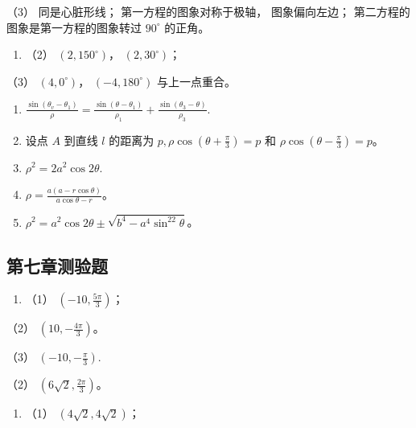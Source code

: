 （3） 同是心脏形线； 第一方程的图象对称于极轴， 图象偏向左边；
第二方程的图象是第一方程的图象转过 \(90^{\circ}\) 的正角。

\begin{enumerate}
\def\labelenumi{\arabic{enumi}.}
\setcounter{enumi}{2}
\tightlist
\item
  （2） \((2, 150^{\circ})\)， \((2, 30^{\circ})\)；
\end{enumerate}

（3） \((4, 0^{\circ})\)， \((-4, 180^{\circ})\) 与上一点重合。

\begin{enumerate}
\def\labelenumi{\arabic{enumi}.}
\setcounter{enumi}{3}
\item
  \(\frac{\sin(\theta_{v} - \theta_{1})}{\rho} = \frac{\sin(\theta - \theta_{1})}{\rho_{1}} + \frac{\sin(\theta_{3} - \theta)}{\rho_{3}}.\)
\item
  设点 \(A\) 到直线 \(l\) 的距离为
  \(p, \rho \cos \left( \theta + \frac{\pi}{3} \right) = p\) 和
  \(\rho \cos \left( \theta - \frac{\pi}{3} \right) = p\)。
\item
  \(\rho^2 = 2a^2\cos 2\theta .\)
\item
  \(\rho = \frac{a(a - r\cos\theta)}{a\cos\theta - r}\)。
\item
  \(\rho^2 = a^2\cos 2\theta \pm \sqrt{b^4 - a^4\sin^22\theta}\)。
\end{enumerate}

\subsection{第七章测验题}\label{ux7b2cux4e03ux7ae0ux6d4bux9a8cux9898-1}

\begin{enumerate}
\def\labelenumi{\arabic{enumi}.}
\tightlist
\item
  （1） \(\left(-10, \frac{5\pi}{3}\right)\)；
\end{enumerate}

（2） \(\left(10, -\frac{4\pi}{3}\right)\)。

（3） \(\left(-10,-\frac{\pi}{3}\right).\)

（2） \(\left(6\sqrt{2}, \frac{2\pi}{3}\right)\)。

\begin{enumerate}
\def\labelenumi{\arabic{enumi}.}
\setcounter{enumi}{1}
\tightlist
\item
  （1） \((4\sqrt{2}, 4\sqrt{2})\)；
\end{enumerate}

